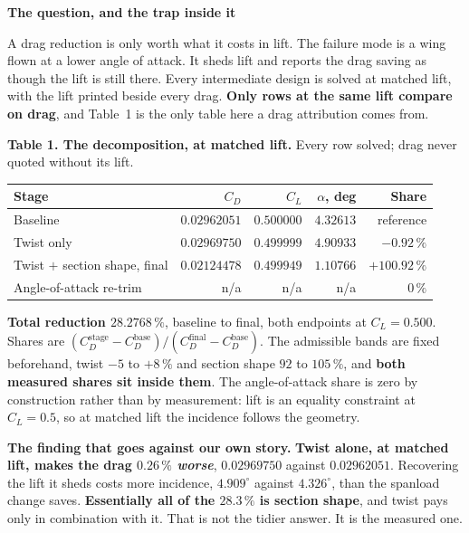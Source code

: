 \documentclass[9pt,a4paper]{article}
\renewcommand{\footnotesize}{\fontsize{6.4}{6.85}\selectfont}
\renewcommand{\scriptsize}{\fontsize{5.7}{6.1}\selectfont}
\begin{document}
\vspace{2.5pt}
\begin{minipage}[t]{0.545\textwidth}
\textbf{The question, and the trap inside it}

\vspace{1pt}
{\footnotesize A drag reduction is only worth what it costs in lift. The failure
mode is a wing flown at a lower angle of attack. It sheds lift and reports the
drag saving as though the lift is still there. Every intermediate design is
solved at matched lift, with the lift printed beside every drag.
\textbf{Only rows at the same lift compare on drag}, and Table~1 is the only
table here a drag attribution comes from.}

\vspace{3pt}
\textbf{Table 1. The decomposition, at matched lift.}
Every row solved; drag never quoted without its lift.

\vspace{1.5pt}
{\fontsize{6.7}{7.9}\selectfont
\begin{tabular}{@{}l r r r r@{}}
\toprule
Stage & $C_D$ & $C_L$ & $\alpha$, deg & Share \\
\midrule
Baseline                        & $0.02962051$ & $0.500000$ & $4.32613$ & reference \\
Twist only                      & $0.02969750$ & $0.499999$ & $4.90933$ & $\mathbf{-0.92\,\%}$ \\
Twist $+$ section shape, final  & $0.02124478$ & $0.499949$ & $1.10766$ & $\mathbf{+100.92\,\%}$ \\
Angle-of-attack re-trim         & n/a          & n/a        & n/a       & $0\,\%$ \\
\bottomrule
\end{tabular}}

\vspace{1.5pt}
{\scriptsize \textbf{Total reduction $\mathbf{28.2768\,\%}$}, baseline to final,
both endpoints at $C_L=0.500$. Shares are
$(C_D^{\mathrm{stage}}-C_D^{\mathrm{base}})/(C_D^{\mathrm{final}}-C_D^{\mathrm{base}})$.
The admissible bands are fixed beforehand, twist $-5$ to $+8\,\%$ and section
shape $92$ to $105\,\%$, and \textbf{both measured shares sit inside them}. The
angle-of-attack share is zero by construction rather than by measurement:
lift is an equality constraint at $C_L=0.5$, so at matched lift the incidence
follows the geometry.}

\vspace{3pt}
{\footnotesize\colorbox{band}{\begin{minipage}[t]{0.978\textwidth}
\textbf{The finding that goes against our own story.} \textbf{Twist alone, at
matched lift, makes the drag $0.26\,\%$ \emph{worse}}, $0.02969750$ against
$0.02962051$. Recovering the lift it sheds costs more incidence,
$4.909^\circ$ against $4.326^\circ$, than the spanload change saves.
\textbf{Essentially all of the $28.3\,\%$ is section shape}, and twist pays only
in combination with it. That is not the tidier answer. It is the measured one.
\end{minipage}}}


\end{minipage}
\end{document}
